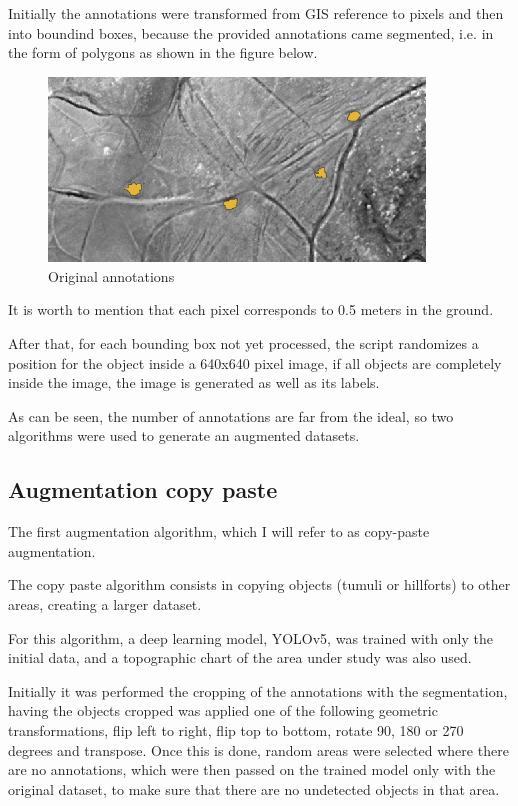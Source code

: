 Initially the annotations were transformed from GIS reference to pixels and then into boundind boxes, because the provided annotations came segmented, i.e. in the form of polygons as shown in the figure below.

\begin{figure}[H]
\centering
\includegraphics[width=10cm]{images/segmentacao_mamoas.png}
\caption{Original annotations}
\end{figure}
It is worth to mention that each pixel corresponds to 0.5 meters in the ground.

After that, for each bounding box not yet processed, the script randomizes a position for the object inside a 640x640 pixel image, if all objects are completely inside the image, the image is generated as well as its labels.

As can be seen, the number of annotations are far from the ideal, so two algorithms were used to generate an augmented datasets.

\subsection{Augmentation copy paste}

The first augmentation algorithm, which I will refer to as copy-paste augmentation.

The copy paste algorithm consists in copying objects (tumuli or hillforts) to other areas, creating a larger dataset.

For this algorithm, a deep learning model, YOLOv5, was trained with only the initial data, and a topographic chart of the area under study was also used. 

Initially it was performed the cropping of the annotations with the segmentation, having the objects cropped was applied one of the following geometric transformations, flip left to right, flip top to bottom, rotate 90, 180 or 270 degrees and transpose.
Once this is done, random areas were selected where there are no annotations, which were then passed on the trained model only with the original dataset, to make sure that there are no undetected objects in that area. 

